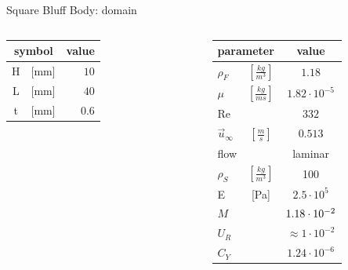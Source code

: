 \documentclass[10pt,t]{beamer}
\begin{document}
\begin{frame}{Square Bluff Body: domain}
\begin{columns}
    	\scriptsize
		\begin{tabular}{ c c | r } 
			\multicolumn{2}{c|}{symbol} & value   \\ 
			\hline
			H  & [\si{mm}] & $10$     \\
			L & [\si{mm}] & $40$  \\
			t  & [\si{mm}] & $0.6$  \\			
		\end{tabular}

		\vspace{1.5cm}
		\begin{tabular}{ l c  | c } 
			\multicolumn{2}{c|}{parameter} & value  \\ 
			\hline
			$\rho_F$ & $\left[\frac{kg}{m^3}\right]$ & \cellcolor{blue!20} $1.18$   \\
			$\mu$& $\left[\frac{kg}{ms}\right]$ & \cellcolor{blue!20} $1.82 \cdot 10^{-5}$  \\
			Re &  & \cellcolor{blue!20} $332$ \\
			$\vec{u}_{\infty}$ & $\left[\frac{m}{s}\right]$ & \cellcolor{blue!20} $0.513$ \\
			flow & & \cellcolor{blue!20} laminar \\
			\hline
			$\rho_S$ & $\left[\frac{kg}{m^3}\right]$ & \cellcolor{orange!50} 100    \\
			E & [\si{Pa}] & \cellcolor{orange!50} $2.5\cdot 10^5$    \\
			\hline
			$M$ & & $ \cellcolor{green!10} 1.18\cdot 10^{-2}$     \\
			\hline
			$U_R$ & & $ \approx 1\cdot 10^{-2}$  \\
			$C_Y$ & & $  1.24 \cdot 10^{-6}$  \\			

		\end{tabular}
\end{columns}
\end{frame}
\end{document}
